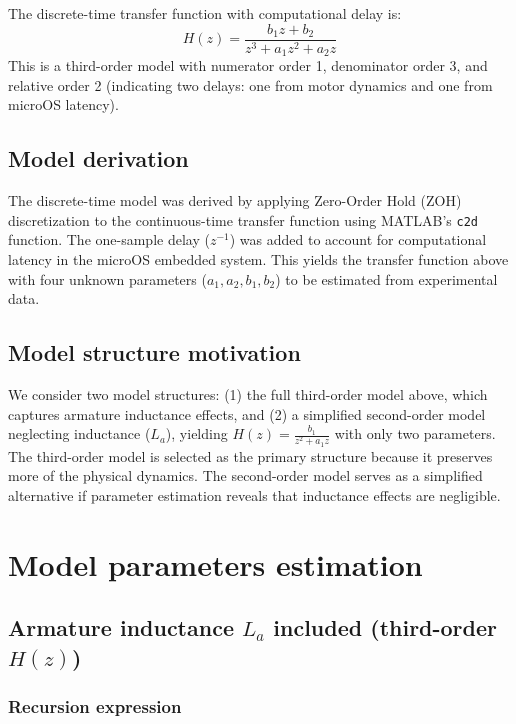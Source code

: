 \documentclass{article}
\begin{document}
	The discrete-time transfer function with computational delay is:
	\begin{equation}
		H(z) = \frac{b_1 z + b_2}{z^{3} + a_1 z^{2} + a_2 z}
	\end{equation}
	This is a third-order model with numerator order 1, denominator order 3, and relative order 2 (indicating two delays: one from motor dynamics and one from microOS latency).
	
	\subsection{Model derivation}
	
	The discrete-time model was derived by applying Zero-Order Hold (ZOH) discretization to the continuous-time transfer function using MATLAB's \texttt{c2d} function. The one-sample delay ($z^{-1}$) was added to account for computational latency in the microOS embedded system. This yields the transfer function above with four unknown parameters ($a_1, a_2, b_1, b_2$) to be estimated from experimental data.
	
	\subsection{Model structure motivation}
	
	We consider two model structures: (1) the full third-order model above, which captures armature inductance effects, and (2) a simplified second-order model neglecting inductance ($L_a$), yielding $H(z) = \frac{b_1}{z^2 + a_1 z}$ with only two parameters. The third-order model is selected as the primary structure because it preserves more of the physical dynamics. The second-order model serves as a simplified alternative if parameter estimation reveals that inductance effects are negligible.
	
	\section{Model parameters estimation}
	
	\subsection{Armature inductance \texorpdfstring{$L_a$}{La} included (third-order \texorpdfstring{$H(z)$}{H(z)})}
	
	\subsubsection*{Recursion expression}
	
\end{document}
